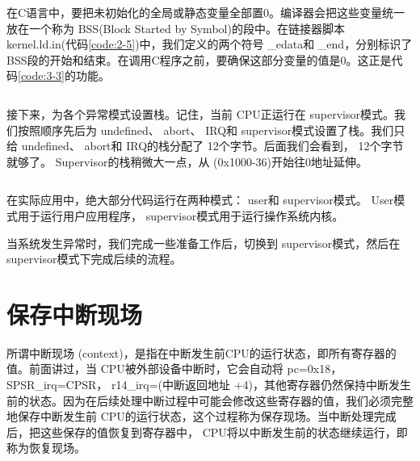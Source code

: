 \documentclass[main.tex]{subfiles}
\begin{document}
\begin{CJK*}{UTF8}{song}
\begin{code}
\label{code:3-2}
\inputminted[firstline=106,lastline=112,linenos,numbersep=5pt,frame=lines,framesep=2mm]{gas}{src/chapter03/kernel/entry.S}
\end{code}

在C语言中，要把未初始化的全局或静态变量全部置0。编译器会把这些变量统一放在一个称为 BSS(Block Started by Symbol)的段中。在链接器脚本 kernel.ld.in(代码\ref{code:2-5})中，我们定义的两个符号 \_edata和 \_end，分别标识了 BSS段的开始和结束。在调用C程序之前，要确保这部分变量的值是0。这正是代码\ref{code:3-3}的功能。

\begin{code}
\label{code:3-3}
\inputminted[firstline=114,lastline=123,linenos,numbersep=5pt,frame=lines,framesep=2mm]{gas}{src/chapter03/kernel/entry.S}
\end{code}

接下来，为各个异常模式设置栈。记住，当前 CPU正运行在 supervisor模式。我们按照顺序先后为 undefined、 abort、 IRQ和 supervisor模式设置了栈。我们只给 undefined、 abort和 IRQ的栈分配了 12个字节。后面我们会看到， 12个字节就够了。 Supervisor的栈稍微大一点，从 (0x1000-36)开始往0地址延伸。
\begin{code}
\label{code:3-4}
\inputminted[firstline=125,lastline=142,linenos,numbersep=5pt,frame=lines,framesep=2mm]{gas}{src/chapter03/kernel/entry.S}
\end{code}

在实际应用中，绝大部分代码运行在两种模式： user和 supervisor模式。 User模式用于运行用户应用程序， supervisor模式用于运行操作系统内核。
\par
当系统发生异常时，我们完成一些准备工作后，切换到 supervisor模式，然后在 supervisor模式下完成后续的流程。

\section{保存中断现场}
所谓中断现场 (context)，是指在中断发生前CPU的运行状态，即所有寄存器的值。前面讲过，当 CPU被外部设备中断时，它会自动将 pc=0x18， SPSR\_\-irq=CPSR， r14\_\-irq=(中断返回地址 +4)，其他寄存器仍然保持中断发生前的状态。因为在后续处理中断过程中可能会修改这些寄存器的值，我们必须完整地保存中断发生前 CPU的运行状态，这个过程称为保存现场。当中断处理完成后，把这些保存的值恢复到寄存器中， CPU将以中断发生前的状态继续运行，即称为恢复现场。


\end{CJK*}
\end{document}

